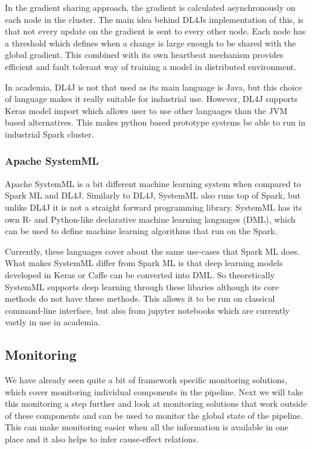 In the gradient sharing approach, the gradient is calculated asynchronously on each node in the cluster.
The main idea behind DL4Js implementation of this, is that not every update on the gradient is sent to every other node.
Each node has a threshold which defines when a change is large enough to be shared with the global gradient.
This combined with its own heartbeat mechanism provides efficient and fault tolerant way of training a model in distributed environment. \cite{dl4j}

In academia, DL4J is not that used as its main language is Java, but this choice of language makes it really suitable for industrial use.
However, DL4J supports Keras model import which allows user to use other languages than the JVM based alternatives.
This makes python based prototype systems be able to run in industrial Spark cluster. \cite{dl4j}

\subsubsection{Apache SystemML}

Apache SystemML is a bit different machine learning system when compared to Spark ML and DL4J.
Similarly to DL4J, SystemML also runs top of Spark, but unlike DL4J it is not a straight forward programming library.
SystemML has its own R- and Python-like declarative machine learning languages (DML), which can be used to define machine learning algorithms that run on the Spark. \cite{systemml}

Currently, these languages cover about the same use-cases that Spark ML does.
What makes SystemML differ from Spark ML is that deep learning models developed in Keras or Caffe can be converted into DML.
So theoretically SystemML supports deep learning through these libaries although its core methods do not have these methods.
This allows it to be run on classical command-line interface, but also from jupyter notebooks which are currently vastly in use in academia. \cite{systemml}

\subsection{Monitoring}

We have already seen quite a bit of framework specific monitoring solutions, which cover monitoring individual components in the pipeline.
Next we will take this monitoring a step further and look at monitoring solutions that work outside of these components and can be used to monitor the global state of the pipeline.
This can make monitoring easier when all the information is available in one place and it also helps to infer cause-effect relations.

